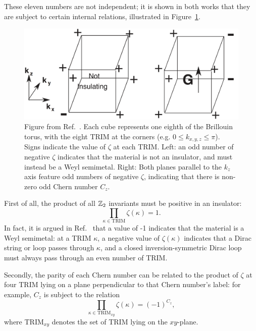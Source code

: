 These eleven numbers are not independent; it is shown in both works that they are subject to certain internal relations, illustrated in Figure~\ref{fig:inversion-relations}.
\begin{figure}[htb!]
	\centering
	\includegraphics[width=.7\linewidth]{Images/inversion-relations}
	\caption{Figure from Ref.~\cite{Turner_inversion}. Each cube represents one eighth of the Brillouin torus, with the eight TRIM at the corners (e.g. $0\leq k_{x,y,z}\leq\pi$). Signs indicate the value of $\zeta$ at each TRIM. Left: an odd number of negative $\zeta$ indicates that the material is not an insulator, and must instead be a Weyl semimetal. Right: Both planes parallel to the $k_z$ axis feature odd numbers of negative $\zeta$, indicating that there is non-zero odd Chern number $C_z$.}
	\label{fig:inversion-relations}
\end{figure}
First of all, the product of all $\mathbb{Z}_2$ invariants must be positive in an insulator:
\begin{equation*}
	\prod_{\kappa\in\text{TRIM}} \zeta(\kappa) = 1.
\end{equation*}
In fact, it is argued in Ref.~\cite{Turner_inversion} that a value of -1 indicates that the material is a Weyl semimetal: at a TRIM $\kappa$, a negative value of $\zeta(\kappa)$ indicates that a Dirac string or loop passes through $\kappa$, and a closed inversion-symmetric Dirac loop must always pass through an even number of TRIM.

Secondly, the parity of each Chern number can be related to the product of $\zeta$ at four TRIM lying on a plane perpendicular to that Chern number's label: for example, $C_z$ is subject to the relation
\begin{equation*}
	\prod_{\kappa\in\text{TRIM}_{xy}}\zeta(\kappa) = (-1)^{C_z},
\end{equation*}
where TRIM$_{xy}$ denotes the set of TRIM lying on the $xy$-plane.

